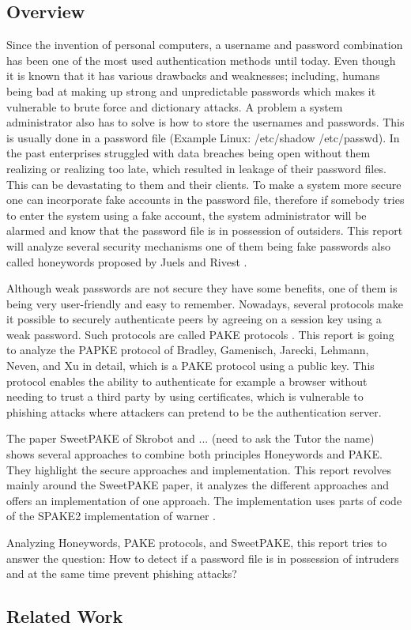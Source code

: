 \documentclass[../main.tex]{subfiles}
\begin{document}
\subsection{Overview}
Since the invention of personal computers, a username and password combination
has been one of the most used authentication methods until today. Even though
it is known that it has various drawbacks and weaknesses; including, humans
being bad at making up strong and unpredictable passwords which makes it
vulnerable to brute force and dictionary attacks. A problem a system
administrator also has to solve is how to store the usernames and passwords.
This is usually done in a password file (Example Linux: /etc/shadow
/etc/passwd). In the past enterprises struggled with data breaches being open
without them realizing or realizing too late, which resulted in leakage of their
password files. This can be devastating to them and their clients. To make a
system more secure one can incorporate fake accounts in the password file,
therefore if somebody tries to enter the system using a fake account, the
system administrator will be alarmed and know that the password file is in
possession of outsiders. This report will analyze several security mechanisms
one of them being fake passwords also called honeywords proposed by Juels and
Rivest \cite{juels2013honeywords}.  

Although weak passwords are not secure they have some benefits, one of them is
being very user-friendly and easy to remember. Nowadays, several protocols make
it possible to securely authenticate peers by agreeing on a session key using a
weak password. Such protocols are called PAKE protocols
\cite{bellare2000authenticated}\cite{boyko2000provably}\cite{canetti2005universally}.
This report is going to analyze the PAPKE protocol of Bradley, Gamenisch,
Jarecki, Lehmann, Neven, and Xu \cite{bradley2019password} in detail, which is a
PAKE protocol using a public key. This protocol enables the ability to
authenticate for example a browser without needing to trust a third party by
using certificates, which is vulnerable to phishing attacks where attackers can
pretend to be the authentication server.

The paper SweetPAKE of Skrobot and ... (need to ask the Tutor the name)
\cite{marjan2023} shows several approaches to combine both principles
Honeywords and PAKE. They highlight the secure approaches and implementation.
This report revolves mainly around the SweetPAKE paper, it analyzes the
different approaches and offers an implementation of one approach. The
implementation uses parts of code of the SPAKE2 implementation of warner \cite{Warner2016}.

Analyzing Honeywords, PAKE protocols, and SweetPAKE, this report tries to
answer the question: How to detect if a password file is in possession of
intruders and at the same time prevent phishing attacks? 

\subsection{Related Work}
\end{document}
